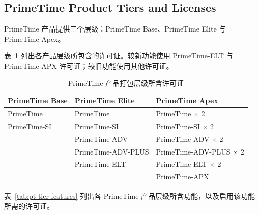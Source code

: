 \subsection*{PrimeTime Product Tiers and Licenses}

PrimeTime 产品提供三个层级：PrimeTime Base、PrimeTime Elite 与 PrimeTime Apex。

表~\ref{tab:pt-tiers-licenses} 列出各产品层级所包含的许可证。较新功能使用 PrimeTime-ELT 与 PrimeTime-APX 许可证；较旧功能使用其他许可证。

\begin{table}[htbp]
\centering
\caption{PrimeTime 产品打包层级所含许可证}
\label{tab:pt-tiers-licenses}
\begin{tabular}{|l|l|l|}
\hline
\textbf{PrimeTime Base} & \textbf{PrimeTime Elite} & \textbf{PrimeTime Apex} \\
\hline
PrimeTime & PrimeTime & PrimeTime $\times$ 2 \\
PrimeTime-SI & PrimeTime-SI & PrimeTime-SI $\times$ 2 \\
 & PrimeTime-ADV & PrimeTime-ADV $\times$ 2 \\
 & PrimeTime-ADV-PLUS & PrimeTime-ADV-PLUS $\times$ 2 \\
 & PrimeTime-ELT & PrimeTime-ELT $\times$ 2 \\
 &  & PrimeTime-APX \\
\hline
\end{tabular}
\end{table}

表~\ref{tab:pt-tier-features} 列出各 PrimeTime 产品层级所含功能，以及启用该功能所需的许可证。

